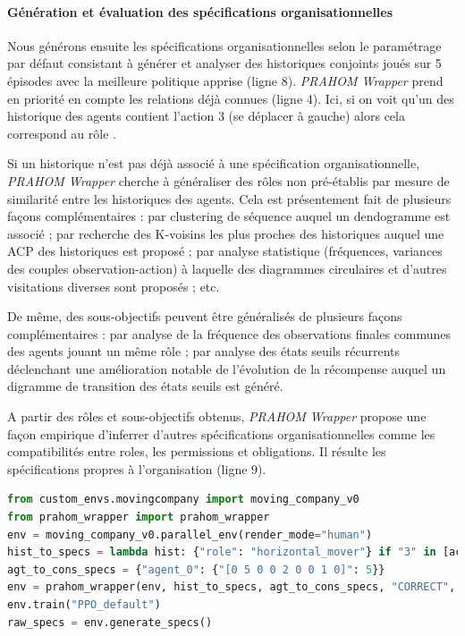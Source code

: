 \documentclass[demonstration]{jfsma}
\newcounter{relation}
\begin{document}
\paragraph{Génération et évaluation des spécifications organisationnelles }

Nous générons ensuite les spécifications organisationnelles selon le paramétrage par défaut consistant à générer et analyser des historiques conjoints joués sur 5 épisodes avec la meilleure politique apprise (ligne 8).
\emph{PRAHOM Wrapper} prend en priorité en compte les relations déjà connues (ligne 4). Ici, si on voit qu'un des historique des agents contient l'action $3$ (se déplacer à gauche) alors cela correspond au rôle .

Si un historique n'est pas déjà associé à une spécification organisationnelle, \emph{PRAHOM Wrapper} cherche à généraliser des rôles non pré-établis par mesure de similarité entre les historiques des agents. Cela est présentement fait de plusieurs façons complémentaires : par clustering de séquence auquel un dendogramme est associé ; par recherche des K-voisins les plus proches des historiques auquel une ACP des historiques est proposé ; par analyse statistique (fréquences, variances des couples observation-action) à laquelle des diagrammes circulaires et d'autres visitations diverses sont proposés ; etc.

De même, des sous-objectifs peuvent être généralisés de plusieurs façons complémentaires : par analyse de la fréquence des observations finales communes des agents jouant un même rôle ; par analyse des états seuils récurrents déclenchant une amélioration notable de l'évolution de la récompense auquel un digramme de transition des états seuils est généré.

A partir des rôles et sous-objectifs obtenus, \emph{PRAHOM Wrapper} propose une façon empirique d'inferrer d'autres spécifications organisationnelles comme les compatibilités entre roles, les permissions et obligations. Il résulte les spécifications propres à l'organisation (ligne 9).

\begin{lstlisting}[language=Python, caption={Utilisation synthétique de \emph{PRAHOM Wrapper} pour \emph{Moving Company}}, label={lst:wrapper_mc}]
from custom_envs.movingcompany import moving_company_v0
from prahom_wrapper import prahom_wrapper
env = moving_company_v0.parallel_env(render_mode="human")
hist_to_specs = lambda hist: {"role": "horizontal_mover"} if "3" in [act for obs, act in hist.items()] else None
agt_to_cons_specs = {"agent_0": {"[0 5 0 0 2 0 0 1 0]": 5}}
env = prahom_wrapper(env, hist_to_specs, agt_to_cons_specs, "CORRECT", ["sequence_clustering"], ["role", "goals"], ["dendogram", "PCA"])
env.train("PPO_default")
raw_specs = env.generate_specs()
\end{lstlisting}
\end{document}
